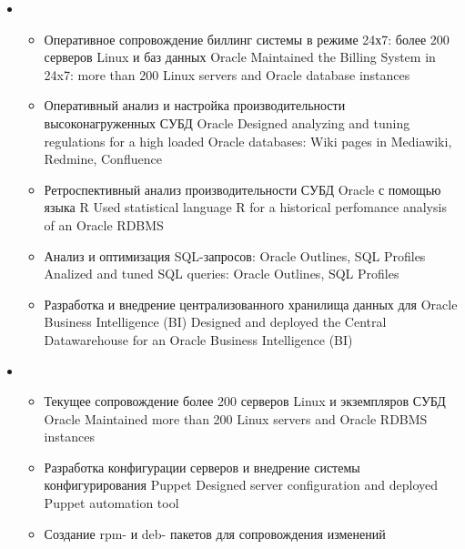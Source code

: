 \documentclass[11pt,a4paper,sans]{moderncv}        %
\begin{document}
{\begin{itemize}
\begin{itemize}
				{Разработка регламентов обеспечения отказоустойчивости систем биллинга: Oracle STANDBY database, Oracle DataGuard, Oracle GoldenGate}
				{Designed a fault tolerance strategy for the Billing System: Oracle standby, Oracle DataGuard, Oracle GoldenGate}
		\end{itemize}
	\item {}
		\begin{itemize}
			\item {}
				{Оперативное сопровождение биллинг системы в режиме 24х7: более 200 серверов Linux и баз данных Oracle}
				{Maintained the Billing System in 24x7: more than 200 Linux servers and Oracle database instances}
			\item {}
				{Оперативный анализ и настройка производительности высоконагруженных СУБД Oracle}
				{Designed analyzing and tuning regulations for a high loaded Oracle databases: Wiki pages in Mediawiki, Redmine, Confluence}
			\item {}
				{Ретроспективный анализ производительности СУБД Oracle с помощью языка R}
				{Used statistical language R for a historical perfomance analysis of an Oracle RDBMS}
			\item {}
				{Анализ и оптимизация SQL-запросов: Oracle Outlines, SQL Profiles}
				{Analized and tuned SQL queries: Oracle Outlines, SQL Profiles}
			\item {}
				{Разработка и внедрение централизованного хранилища данных для Oracle Business Intelligence (BI)}
				{Designed and deployed the Central Datawarehouse for an Oracle Business Intelligence (BI)}
		\end{itemize}
	\item {}
		\begin{itemize}
			\item {}
				{Текущее сопровождение более 200 серверов Linux и экземпляров СУБД Oracle}
				{Maintained more than 200 Linux servers and Oracle RDBMS instances}
			\item {}
				{Разработка конфигурации серверов и внедрение системы конфигурирования Puppet}
				{Designed server configuration and deployed Puppet automation tool}
			\item {}
				{Создание rpm- и deb- пакетов для сопровождения изменений}

\end{itemize}
\end{itemize}}
\end{document}
